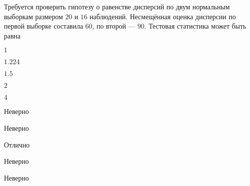 
\begin{question}
Требуется проверить гипотезу о равенстве дисперсий по двум нормальным
выборкам размером \(20\) и \(16\) наблюдений. Несмещённая оценка
дисперсии по первой выборке составила \(60\), по второй --- \(90\).
Тестовая статистика может быть равна
\begin{answerlist}
  \item \(1\)
  \item \(1.224\)
  \item \(1.5\)
  \item \(2\)
  \item \(4\)
\end{answerlist}
\end{question}

\begin{solution}
\begin{answerlist}
  \item Неверно
  \item Неверно
  \item Отлично
  \item Неверно
  \item Неверно
\end{answerlist}
\end{solution}

